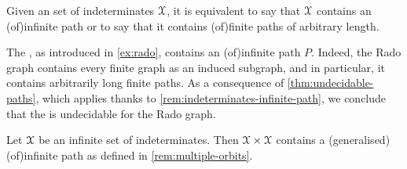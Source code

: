 \begin{remark}[name={},restate=rem:indeterminates-infinite-path]
  \label{rem:indeterminates-infinite-path}
  Given an  set of indeterminates $\mathcal{X}$,
  it is equivalent to say that $\mathcal{X}$ contains an \kl(of){infinite path}
  or to say that it contains \kl(of){finite paths} of arbitrary length.
\end{remark}



\begin{example}
  \label{ex:rado-graph-path}
  The , as introduced in \cref{ex:rado},
  contains an \kl(of){infinite path} $P$. Indeed, the Rado graph
  contains every finite graph as an induced subgraph, and in particular,
  it contains arbitrarily long finite paths. 
  As a consequence of \cref{thm:undecidable-paths},
  which applies thanks to \cref{rem:indeterminates-infinite-path},
  we conclude that the 
  is undecidable for the Rado graph.
\end{example}

\begin{example}[name={},restate=ex:product-indets]
  \label{ex:product-indets}
  Let $\mathcal{X}$ be an  infinite set of indeterminates.
  Then $\mathcal{X} \times \mathcal{X}$ contains a (generalised) \kl(of){infinite path}
  as defined in \cref{rem:multiple-orbits}.
\end{example}



